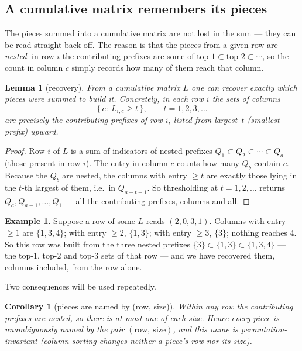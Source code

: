 \documentclass[11pt,a4paper]{article}
\theoremstyle{definition}
\newtheorem{example}[definition]{Example}
\theoremstyle{plain}
\newtheorem{lemma}[definition]{Lemma}
\newtheorem{corollary}[definition]{Corollary}
\begin{document}
\subsection{A cumulative matrix remembers its pieces}

The pieces summed into a cumulative matrix are not lost in the sum --- they can
be read straight back off. The reason is that the pieces from a given row are
\emph{nested}: in row $i$ the contributing prefixes are some of
$\text{top-}1\subset\text{top-}2\subset\cdots$, so the count in column $c$ simply
records how many of them reach that column.

\begin{lemma}[recovery]\label{lem:recover}
From a cumulative matrix $L$ one can recover exactly which pieces were summed to
build it. Concretely, in each row $i$ the sets of columns
\[
   \{\,c:\ L_{i,c}\ge t\,\},\qquad t=1,2,3,\dots
\]
are precisely the contributing prefixes of row $i$, listed from largest~$t$
(smallest prefix) upward.
\end{lemma}

\begin{proof}
Row $i$ of $L$ is a sum of indicators of nested prefixes
$Q_1\subset Q_2\subset\cdots\subset Q_a$ (those present in row $i$). The entry in
column $c$ counts how many $Q_b$ contain $c$. Because the $Q_b$ are nested, the
columns with entry $\ge t$ are exactly those lying in the $t$-th largest of them,
i.e.\ in $Q_{a-t+1}$. So thresholding at $t=1,2,\dots$ returns
$Q_a,Q_{a-1},\dots,Q_1$ --- all the contributing prefixes, columns and all.
\end{proof}

\begin{example}\label{ex:staircase}
Suppose a row of some $L$ reads $(2,0,3,1)$. Columns with entry $\ge1$ are
$\{1,3,4\}$; with entry $\ge2$, $\{1,3\}$; with entry $\ge3$, $\{3\}$; nothing
reaches $4$. So this row was built from the three nested prefixes
$\{3\}\subset\{1,3\}\subset\{1,3,4\}$ --- the top-$1$, top-$2$ and top-$3$ sets
of that row --- and we have recovered them, columns included, from the row
alone.
\end{example}

Two consequences will be used repeatedly.

\begin{corollary}[pieces are named by (row, size)]\label{cor:rowsize}
Within any row the contributing prefixes are nested, so there is \emph{at most
one} of each size. Hence every piece is unambiguously named by the pair
$(\text{row},\ \text{size})$, and this name is permutation-invariant (column
sorting changes neither a piece's row nor its size).
\end{corollary}
\end{document}
